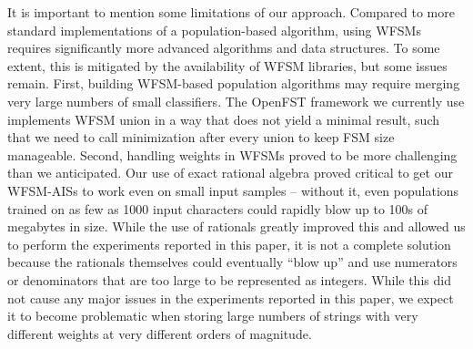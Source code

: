 \documentclass{llncs}
\begin{document}




It is important to mention some limitations of our approach. Compared to more standard implementations of a population-based algorithm, using WFSMs requires significantly more advanced algorithms and data structures. To some extent, this is mitigated by the availability of WFSM libraries, but some issues remain. First, building WFSM-based population algorithms may require
merging very large numbers of small classifiers. The OpenFST framework we currently use
implements WFSM union in a way that does not yield a minimal result, such that we need
to call minimization after every union to keep FSM size manageable. %
Second, handling weights in WFSMs proved to be more challenging than we
anticipated. Our use of exact rational algebra proved critical to get our WFSM-AISs 
to work even on small  input samples -- without it, even populations trained on as 
few as 1000 input characters could rapidly blow up to 100s of megabytes in size. 
While the use of rationals greatly improved this and allowed us to perform the
experiments reported in this paper, it is not a complete solution because the rationals
themselves could eventually ``blow up'' and use numerators or denominators that are too 
large to be represented as integers. 
While this did not cause any major 
issues in the experiments reported in this paper, we expect it to become problematic 
when storing large numbers of strings with very different weights at very different 
orders of magnitude. 
\end{document}
